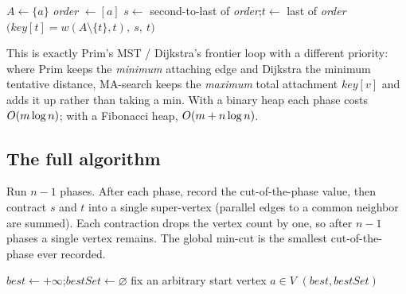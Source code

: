 \begin{algorithm}[H]
\caption{\textsc{MinimumCutPhase}$(\Gph,w,a)$ --- one MA-search}
\label{ch11:alg-phase}
\DontPrintSemicolon
{}
$A \gets \{a\}$\;
\textit{order} $\gets [a]$\;
$s\gets$ second-to-last of \textit{order};\quad $t\gets$ last of \textit{order}\;
\Return $\big(\textit{key}[t]=w(A\setminus\{t\},t),\ s,\ t\big)$\;
\end{algorithm}

This is exactly Prim's MST / Dijkstra's frontier loop with a different priority: where Prim keeps the \emph{minimum} attaching edge and Dijkstra the minimum tentative distance, MA-search keeps the \emph{maximum} total attachment $\textit{key}[v]$ and adds it up rather than taking a min. With a binary heap each phase costs $O(m\log n)$; with a Fibonacci heap, $O(m + n\log n)$.

\subsection{The full algorithm}

Run $n-1$ phases. After each phase, record the cut-of-the-phase value, then contract $s$ and $t$ into a single super-vertex (parallel edges to a common neighbor are summed). Each contraction drops the vertex count by one, so after $n-1$ phases a single vertex remains. The global min-cut is the smallest cut-of-the-phase ever recorded.

\begin{algorithm}[H]
\caption{\textsc{StoerWagner}$(\Gph,w)$}
\label{ch11:alg-sw}
\DontPrintSemicolon
{}
$\textit{best}\gets +\infty$;\quad $\textit{bestSet}\gets\varnothing$\;
fix an arbitrary start vertex $a\in V$\;
\Return $(\textit{best}, \textit{bestSet})$\;
\end{algorithm}

